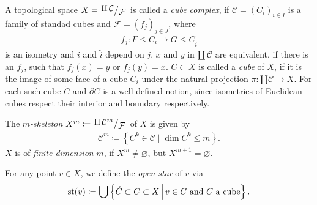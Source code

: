 \begin{defin}
  A topological space \(X = \quot{\amalg\,\mathcal{C}}{\mathcal{F}}\) is called a \emph{cube complex}, if \(\mathcal{C} = {(C_i)}_{i \in I}\) is a family of standad cubes and \(\mathcal{F} = {(f_j)}_{j \in J}\), where
  \begin{align*}
    f_j\colon F \leq C_i \to G \leq C_{\tilde i}
  \end{align*}
  is an isometry and \(i\) and \(\tilde i\) depend on \(j\). \(x\) and \(y\) in \(\amalg\,\mathcal{C}\) are equivalent, if there is an \(f_j\), such that \(f_j(x) = y\) or \(f_j(y) = x\). \(C \subset X\) is called a \emph{cube} of \(X\), if it is the image of some face of a cube \(C_i\) under the natural projection \(\pi \colon \amalg \mathcal{C} \to X\). For each such cube \(\mathring {C}\) and \(\partial C\) is a well-defined notion, since isometries of Euclidean cubes respect their interior and boundary respectively.

  The \emph{\(m\)-skeleton} \(X^m \coloneqq \quot{\amalg\,\mathcal{C}^m}{\mathcal{F}}\) of \(X\) is given by
  \begin{align*}
    \mathcal{C}^m \coloneqq \left\{C^k \in \mathcal{C} \mid \dim C^k \leq m\right\}.
  \end{align*}
  \(X\) is of \emph{finite dimension} \(m\), if \(X^m \neq \varnothing\), but \(X^{m+1} = \varnothing\).

  For any point \(v \in X\), we define the \emph{open star} of \(v\) via
  \begin{align*}
    \operatorname{st}(v) \coloneqq \bigcup \left\{\mathring{C} \subset C \subset X \,\middle|\, v \in C \text{ and } C \text{ a cube} \right\}.
  \end{align*}
\end{defin}

\begin{bsp}
\end{bsp}

